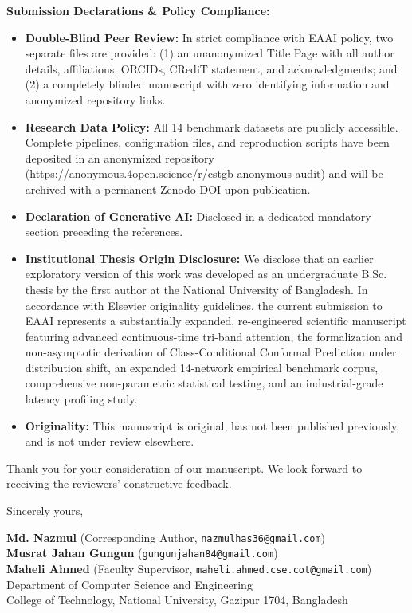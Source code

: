 \documentclass[11pt,a4paper]{article}
\begin{document}
\vspace{0.6em}
\noindent
\textbf{Submission Declarations \& Policy Compliance:}
\begin{itemize}[leftmargin=*,itemsep=2pt,topsep=2pt]
    \item \textbf{Double-Blind Peer Review:} In strict compliance with EAAI policy, two separate files are provided: (1) an unanonymized Title Page with all author details, affiliations, ORCIDs, CRediT statement, and acknowledgments; and (2) a completely blinded manuscript with zero identifying information and anonymized repository links.
    \item \textbf{Research Data Policy:} All 14 benchmark datasets are publicly accessible. Complete pipelines, configuration files, and reproduction scripts have been deposited in an anonymized repository (\url{https://anonymous.4open.science/r/cstgb-anonymous-audit}) and will be archived with a permanent Zenodo DOI upon publication.
    \item \textbf{Declaration of Generative AI:} Disclosed in a dedicated mandatory section preceding the references.
    \item \textbf{Institutional Thesis Origin Disclosure:} We disclose that an earlier exploratory version of this work was developed as an undergraduate B.Sc. thesis by the first author at the National University of Bangladesh. In accordance with Elsevier originality guidelines, the current submission to EAAI represents a substantially expanded, re-engineered scientific manuscript featuring advanced continuous-time tri-band attention, the formalization and non-asymptotic derivation of Class-Conditional Conformal Prediction under distribution shift, an expanded 14-network empirical benchmark corpus, comprehensive non-parametric statistical testing, and an industrial-grade latency profiling study.
    \item \textbf{Originality:} This manuscript is original, has not been published previously, and is not under review elsewhere.
\end{itemize}

\vspace{0.8em}
\noindent
Thank you for your consideration of our manuscript. We look forward to receiving the reviewers' constructive feedback.

\vspace{1.2em}
\noindent
Sincerely yours,

\vspace{0.8em}
\noindent
\textbf{Md. Nazmul} (Corresponding Author, \texttt{nazmulhas36@gmail.com}) \\
\textbf{Musrat Jahan Gungun} (\texttt{gungunjahan84@gmail.com}) \\
\textbf{Maheli Ahmed} (Faculty Supervisor, \texttt{maheli.ahmed.cse.cot@gmail.com}) \\
Department of Computer Science and Engineering \\
College of Technology, National University, Gazipur 1704, Bangladesh
\end{document}
